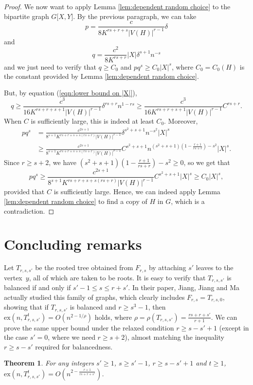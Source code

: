 \documentclass[11pt]{article}
\numberwithin{equation}{section}
\newtheorem{theorem}{\bf Theorem}[section]
\theoremstyle{definition}
\def\ex{\mathrm{ex}}
\begin{document}
\begin{proof}
	We now want to apply Lemma \ref{lem:dependent random choice} to the bipartite graph $G\lbrack X,Y\rbrack$. By the previous paragraph, we can take $$p=\frac{c}{8K^{rs+r+s}|V(H)|^{r-1}}\delta$$
	and
	$$q=\frac{c^2}{8K^{rs+r}}|X|\delta^{s+1}n^{-s}$$
	and we just need to verify that $q\geq C_0$ and $pq^s\geq C_0|X|^s$, where $C_0=C_0(H)$ is the constant provided by Lemma \ref{lem:dependent random choice}. 
	
	But, by equation (\ref{eqn:lower bound on |X|}),
	$$q\geq \frac{c^3}{16K^{rs+r+s+1}|V(H)|^{r-1}}\delta^{rs+r}n^{1-rs}\geq \frac{c^3}{16K^{rs+r+s+1}|V(H)|^{r-1}}C^{rs+r}.$$
	When $C$ is sufficiently large, this is indeed at least $C_0$.
	Moreover,
	\begin{align*}
		pq^s
		&= \frac{c^{2s+1}}{8^{s+1}K^{rs+r+s+s(rs+r)}|V(H)|^{r-1}}\delta^{s^2+s+1}n^{-s^2}|X|^s \\
		&\geq \frac{c^{2s+1}}{8^{s+1}K^{rs+r+s+s(rs+r)}|V(H)|^{r-1}}C^{s^2+s+1}n^{(s^2+s+1)(1-\frac{r+1}{rs+r})-s^2}|X|^s.
	\end{align*}
	Since $r\geq s+2$, we have $(s^2+s+1)(1-\frac{r+1}{rs+r})-s^2\geq 0$, so we get that
	$$pq^s\geq \frac{c^{2s+1}}{8^{s+1}K^{rs+r+s+s(rs+r)}|V(H)|^{r-1}}C^{s^2+s+1}|X|^s\geq C_0|X|^s,$$
	provided that $C$ is sufficiently large. Hence,  we can indeed apply Lemma \ref{lem:dependent random choice} to find a copy of $H$ in $G$, which is a contradiction.
\end{proof}

\section{Concluding remarks}

Let $T_{r,s, s'}$ be the rooted tree obtained from $F_{r,s}$ by attaching $s'$ leaves to the vertex~$y$, all of which are taken to be roots. It is easy to verify that $T_{r,s, s'}$ is balanced if and only if $s'-1\leq s\leq r+s'$. 
In their paper, Jiang, Jiang and Ma \cite{JJM20} actually studied this family of graphs, which clearly includes $F_{r,s} = T_{r,s,0}$, showing that if $T_{r,s, s'}$ is balanced and $r \geq s^3 - 1$, then $\ex(n,T_{r,s,s'}^t)=O(n^{2-1/\rho})$ holds, where $\rho=\rho(T_{r,s,s'}) = \frac{rs+r+s'}{r+1}$. We can prove the same upper bound under the relaxed condition $r\geq s-s'+1$ (except in the case $s'=0$, where we need $r\geq s+2$), almost matching the inequality $r\geq s-s'$ required for balancedness. 

\begin{theorem}
    For any integers $s'\geq 1$, $s\geq s'-1$, $r\geq s-s'+1$ and $t\geq 1$, $\ex(n,T_{r,s,s'}^t)=O(n^{2-\frac{r+1}{rs+r+s'}})$.
\end{theorem}
\end{document}
